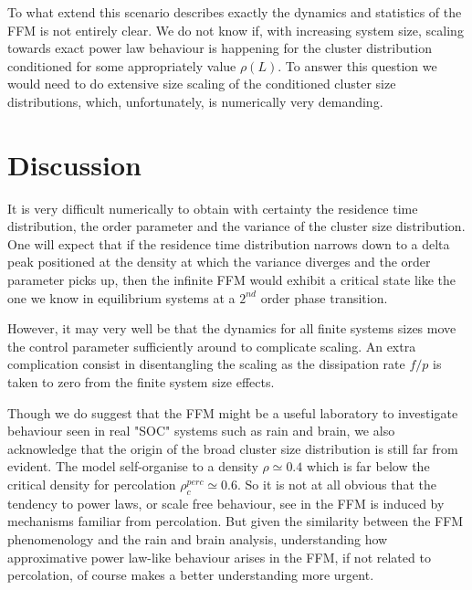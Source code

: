 \documentclass[aps,prl,showpacs,superscriptaddress,groupedaddress,notitlepage]{revtex4-1}
\begin{document}
To what extend this scenario describes exactly the dynamics and statistics of the FFM is not entirely clear.  We do not know if, with increasing system size, scaling towards exact power law behaviour is happening for the cluster distribution conditioned for some  appropriately value $\rho(L)$. To answer this question we would need to do extensive size scaling of the conditioned cluster size distributions, which, unfortunately, is numerically very demanding.

 


\section{Discussion}
It is very difficult numerically to obtain with certainty the residence time distribution, the order parameter and the variance of the cluster size distribution. One will expect that if the residence time distribution narrows down to a delta peak positioned at the density at which the variance diverges and the order parameter picks up, then the infinite FFM would exhibit a critical state like the one we know in equilibrium systems at a $2^{nd}$ order phase transition. 

However, it may very well be that the dynamics for all finite systems sizes move the control parameter sufficiently around to complicate scaling. An extra complication consist in disentangling the scaling as the dissipation rate $f/p$ is taken to zero from the finite system size effects\cite{Pruessner2002}.

Though we do suggest that the FFM might be a useful laboratory to investigate behaviour seen in real "SOC" systems such as rain and brain, we also acknowledge that the origin of the broad cluster size distribution is still far from evident. The model self-organise to a density $\rho\simeq 0.4$ which is far below the critical density for percolation $\rho_c^{perc}\simeq0.6$. So it is not at all obvious that the tendency to power laws, or scale free behaviour, see in the FFM is induced by mechanisms familiar from percolation. But given the similarity between the FFM phenomenology and the rain and brain analysis, understanding how approximative power law-like behaviour arises in the FFM, if not related to percolation, of course makes a better understanding more urgent. 
  
\end{document}

